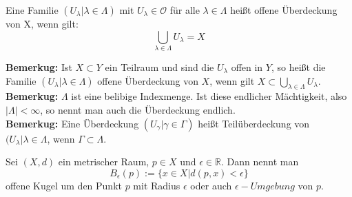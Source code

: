 \begin{Def}
	Eine Familie \( (U_{\lambda} | \lambda \in \Lambda) \) mit \(U_{\lambda} \in \mathcal{O} \) für alle \( \lambda \in \Lambda \) heißt 	offene Überdeckung von X, wenn gilt:
	\[ \bigcup_{\lambda \in \Lambda } U_{\lambda} = X \]
\end{Def}
\textbf{Bemerkug:} Ist \(X \subset Y\) ein Teilraum und sind die \(U_{\lambda}\) offen in \(Y\), so heißt die Familie \( (U_{\lambda} | \lambda \in \Lambda) \) offene Überdeckung von
\(X\), wenn gilt \(X \subset \bigcup_{\lambda \in \Lambda} U_{\lambda}\).
\\
\textbf{Bemerkug:} \(\Lambda\) ist eine belibige Indexmenge. Ist diese endlicher Mächtigkeit, also \(|\Lambda| < \infty\), so nennt man auch die Überdeckung endlich. 
\\
\textbf{Bemerkug:} Eine Überdeckung \( (U_{\gamma} | \gamma \in \Gamma) \)  heißt Teilüberdeckung von \( (U_{\lambda} | \lambda \in \Lambda \), wenn \(\Gamma \subset \Lambda\). 

\begin{Def}
	Sei \((X,d)\) ein metrischer Raum, \(p \in X\) und \(\epsilon \in \mathbb{R}\). Dann nennt man
	\[ B_{\epsilon}(p) := \{ x \in X | d(p,x) < \epsilon \} \]
	offene Kugel um den Punkt \(p\) mit Radius \(\epsilon\) oder auch \(\epsilon-Umgebung\) von \(p\).
\end{Def}
